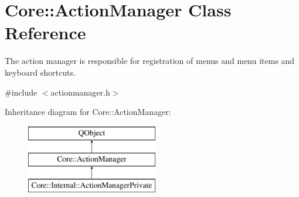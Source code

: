 \hypertarget{class_core_1_1_action_manager}{\section{Core\-:\-:Action\-Manager Class Reference}
\label{class_core_1_1_action_manager}
}


The action manager is responsible for registration of menus and menu items and keyboard shortcuts.  




{\ttfamily \#include $<$actionmanager.\-h$>$}

Inheritance diagram for Core\-:\-:Action\-Manager\-:\begin{figure}[H]
\begin{center}
\leavevmode
\includegraphics[height=3.000000cm]{class_core_1_1_action_manager}
\end{center}
\end{figure}
